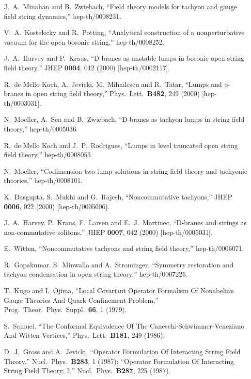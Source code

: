 \documentclass[a4paper,12pt]{article}
\begin{document}
\begin{thebibliography}{99}
J.~A.~Minahan and B.~Zwiebach,
``Field theory models for tachyon and gauge field string dynamics,''
hep-th/0008231.

V.~A.~Kostelecky and R.~Potting,
``Analytical construction of a nonperturbative vacuum
for the open  bosonic string,''
hep-th/0008252.

J.~A.~Harvey and P.~Kraus,
``D-branes as unstable lumps in bosonic open string field theory,''
JHEP {\bf 0004}, 012 (2000)
[hep-th/0002117].

R.~de Mello Koch, A.~Jevicki, M.~Mihailescu and R.~Tatar,
``Lumps and p-branes in open string field theory,''
Phys.\ Lett.\  {\bf B482}, 249 (2000)
[hep-th/0003031].

N.~Moeller, A.~Sen and B.~Zwiebach,
``D-branes as tachyon lumps in string field theory,''
hep-th/0005036.

R.~de Mello Koch and J.~P.~Rodrigues,
``Lumps in level truncated open string field theory,''
hep-th/0008053.

N.~Moeller,
``Codimension two lump solutions in string field theory and tachyonic
theories,'' hep-th/0008101.

K.~Dasgupta, S.~Mukhi and G.~Rajesh,
``Noncommutative tachyons,''
JHEP {\bf 0006}, 022 (2000)
[hep-th/0005006].

J.~A.~Harvey, P.~Kraus, F.~Larsen and E.~J.~Martinec,
``D-branes and strings as non-commutative solitons,''
JHEP {\bf 0007}, 042 (2000)
[hep-th/0005031].

E.~Witten,
``Noncommutative tachyons and string field theory,''
hep-th/0006071.

R.~Gopakumar, S.~Minwalla and A.~Strominger,
``Symmetry restoration and tachyon condensation in open string
theory,''
hep-th/0007226.

T.~Kugo and I.~Ojima,
``Local Covariant Operator Formalism Of Nonabelian Gauge Theories And
Quark Confinement Problem,''
Prog.\ Theor.\ Phys.\ Suppl.\  {\bf 66}, 1 (1979).

S.~Samuel,
``The Conformal Equivalence Of The Caneschi-Schwimmer-Veneziano And
Witten Vertices,''
Phys.\ Lett.\  {\bf B181}, 249 (1986).

D.~J.~Gross and A.~Jevicki,
``Operator Formulation Of Interacting String Field Theory,''
Nucl.\ Phys.\  {\bf B283}, 1 (1987);
``Operator Formulation Of Interacting String Field Theory. 2,''
Nucl.\ Phys.\  {\bf B287}, 225 (1987).

\end{thebibliography}
\end{document}
